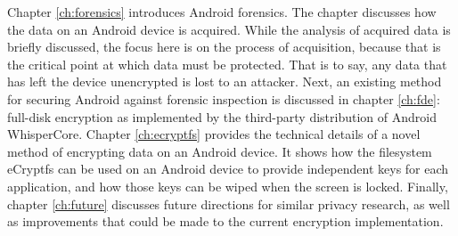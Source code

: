 Chapter \ref{ch:forensics} introduces Android forensics. The chapter discusses how the data on an Android device is acquired. While
the analysis of acquired data is briefly discussed, the focus here is on the process of acquisition, because that is the critical
point at which data must be protected. That is to say, any data that has left the device unencrypted is lost to an attacker.  Next,
an existing method for securing Android against forensic inspection is discussed in chapter \ref{ch:fde}: full-disk encryption as
implemented by the third-party distribution of Android WhisperCore. Chapter \ref{ch:ecryptfs} provides the technical details of a
novel method of encrypting data on an Android device. It shows how the filesystem eCryptfs can be used on an Android device to
provide independent keys for each application, and how those keys can be wiped when the screen is locked. Finally, chapter
\ref{ch:future} discusses future directions for similar privacy research, as well as improvements that could be made to the current
encryption implementation.
